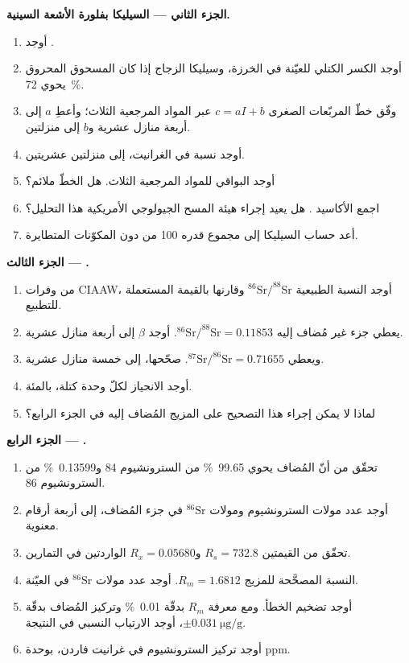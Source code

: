\begin{problem}
\noindent\textbf{الجزء الثاني --- السيليكا بفلورة الأشعة السينية.}
\begin{enumerate}[resume]
  \item أوجد .
  \item أوجد الكسر الكتلي للعيّنة في الخرزة، وسيليكا الزجاج إذا كان
        المسحوق المحروق يحوي \qty{72}{\percent}.
  \item وفّق خطّ المربّعات الصغرى $c = aI + b$ عبر المواد المرجعية الثلاث؛ وأعطِ $a$ إلى
        أربعة منازل عشرية و$b$ إلى منزلتين.
  \item أوجد نسبة  في الغرانيت، إلى منزلتين عشريتين.
  \item أوجد البواقي للمواد المرجعية الثلاث. هل الخطّ ملائم؟
  \item اجمع الأكاسيد . هل يعيد إجراء هيئة المسح الجيولوجي الأمريكية هذا التحليل؟
  \item أعد حساب السيليكا إلى مجموع قدره 100 من دون المكوّنات المتطايرة.
\end{enumerate}

\noindent\textbf{الجزء الثالث --- .}
\begin{enumerate}[resume]
  \item من وفرات CIAAW، أوجد النسبة الطبيعية $^{86}\mathrm{Sr}/^{88}\mathrm{Sr}$ وقارنها
        بالقيمة المستعملة للتطبيع.
  \item يعطي جزء غير مُضاف إليه $^{86}\mathrm{Sr}/^{88}\mathrm{Sr} = 0.11853$. أوجد $\beta$ إلى
        أربعة منازل عشرية.
  \item ويعطي $^{87}\mathrm{Sr}/^{86}\mathrm{Sr} = 0.71655$. صحّحها، إلى خمسة منازل عشرية.
  \item أوجد الانحياز لكلّ وحدة كتلة، بالمئة.
  \item لماذا لا يمكن إجراء هذا التصحيح على المزيج المُضاف إليه في الجزء الرابع؟
\end{enumerate}

\noindent\textbf{الجزء الرابع --- .}
\begin{enumerate}[resume]
  \item تحقّق من أنّ المُضاف يحوي \qty{99.65}{\percent} من السترونشيوم 84 و\qty{0.13599}{\percent}
        من السترونشيوم 86.
  \item أوجد عدد مولات السترونشيوم ومولات $^{86}\mathrm{Sr}$ في جزء المُضاف، إلى أربعة
        أرقام معنوية.
  \item تحقّق من القيمتين $R_s = 732.8$ و$R_x = 0.05680$ الواردتين في التمارين.
  \item النسبة المصحَّحة للمزيج $R_m = 1.6812$. أوجد عدد مولات $^{86}\mathrm{Sr}$
        في العيّنة.
  \item أوجد تضخيم الخطأ. ومع معرفة $R_m$ بدقّة \qty{0.01}{\percent} وتركيز
        المُضاف بدقّة $\pm\qty{0.031}{\micro\gram\per\gram}$، أوجد الارتياب النسبي في
        النتيجة.
  \item أوجد تركيز السترونشيوم في غرانيت فاردن، بوحدة \unit{ppm}.
\end{enumerate}
\end{problem}

